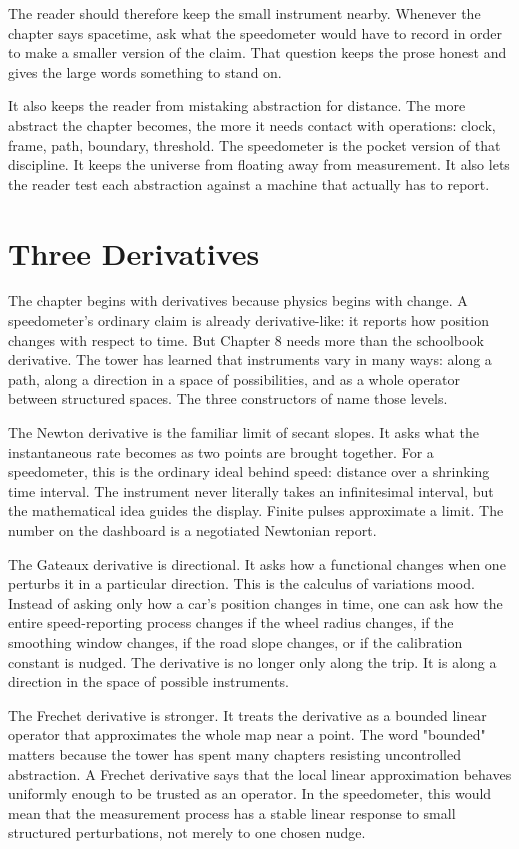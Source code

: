 The reader should therefore keep the small instrument nearby. Whenever the
chapter says spacetime, ask what the speedometer would have to record in order
to make a smaller version of the claim. That question keeps the prose honest
and gives the large words something to stand on.

It also keeps the reader from mistaking abstraction for distance. The more
abstract the chapter becomes, the more it needs contact with operations: clock,
frame, path, boundary, threshold. The speedometer is the pocket version of that
discipline. It keeps the universe from floating away from measurement.
It also lets the reader test each abstraction against a machine that actually
has to report.

\section{Three Derivatives}
\label{se:three-derivatives}

The chapter begins with derivatives because physics begins with change. A
speedometer's ordinary claim is already derivative-like: it reports how
position changes with respect to time. But Chapter 8 needs more than the
schoolbook derivative. The tower has learned that instruments vary in many
ways: along a path, along a direction in a space of possibilities, and as a
whole operator between structured spaces. The three constructors of
 name those levels.

The Newton derivative is the familiar limit of secant slopes. It asks what the
instantaneous rate becomes as two points are brought together. For a
speedometer, this is the ordinary ideal behind speed: distance over a shrinking
time interval. The instrument never literally takes an infinitesimal interval,
but the mathematical idea guides the display. Finite pulses approximate a
limit. The number on the dashboard is a negotiated Newtonian report.

The Gateaux derivative is directional. It asks how a functional changes when
one perturbs it in a particular direction. This is the calculus of variations
mood. Instead of asking only how a car's position changes in time, one can ask
how the entire speed-reporting process changes if the wheel radius changes, if
the smoothing window changes, if the road slope changes, or if the calibration
constant is nudged. The derivative is no longer only along the trip. It is
along a direction in the space of possible instruments.

The Frechet derivative is stronger. It treats the derivative as a bounded
linear operator that approximates the whole map near a point. The word
"bounded" matters because the tower has spent many chapters resisting
uncontrolled abstraction. A Frechet derivative says that the local linear
approximation behaves uniformly enough to be trusted as an operator. In the
speedometer, this would mean that the measurement process has a stable linear
response to small structured perturbations, not merely to one chosen nudge.

